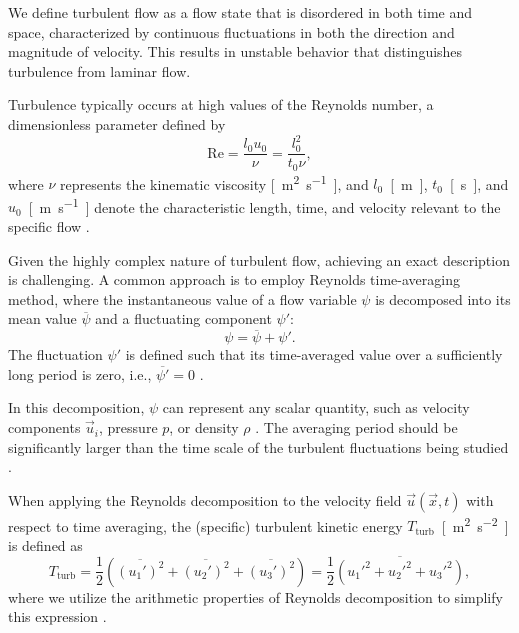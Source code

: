 We define turbulent flow as a flow state that is disordered in both time and space, characterized by continuous fluctuations in both the direction and magnitude of velocity. This results in unstable behavior that distinguishes turbulence from laminar flow.

Turbulence typically occurs at high values of the Reynolds number, a dimensionless parameter defined by
\begin{equation}\label{Re}
	\mathrm{Re} = \dfrac{l_{0} u_{0}}{\nu} = \dfrac{l^{2}_{0}}{t_{0} \nu},
\end{equation}
where $ \nu $ represents the kinematic viscosity \si{[m^2.s^{-1}]}, and $ l_{0} $~\si{[m]}, $ t_{0} $~\si{[s]}, and $ u_{0} $~\si{[m.s^{-1}]} denote the characteristic length, time, and velocity relevant to the specific flow \cite{Landau}.

Given the highly complex nature of turbulent flow, achieving an exact description is challenging. A common approach is to employ Reynolds time-averaging method, where the instantaneous value of a flow variable $ \psi $ is decomposed into its mean value $ \overline{\psi} $ and a fluctuating component $ \psi' $:
\begin{equation}
	\psi = \overline{\psi} + \psi'.
\end{equation}
The fluctuation $ \psi' $ is defined such that its time-averaged value over a sufficiently long period is zero, i.e., $ \overline{\psi'} = 0 $ \cite{Schlichting}.

In this decomposition, $ \psi $ can represent any scalar quantity, such as velocity components $ \vec{u}_i $, pressure $ p $, or density $ \rho $ \cite{Sodja2007}. The averaging period should be significantly larger than the time scale of the turbulent fluctuations being studied \cite{Sodja2007}.

When applying the Reynolds decomposition to the velocity field $ \vec{u} (\vec{x}, t) $ with respect to time averaging, the (specific) turbulent kinetic energy $ T_{\text{turb}} $~\si{[m^{2}.s^{-2}]} is defined as
\begin{equation}\label{eq:turb kin energy}
	T_{\text{turb}} = \dfrac{1}{2} \left( \overline{(u_1 ')^2} + \overline{(u_2 ')^2} + \overline{(u_3 ')^2} \right) = \dfrac{1}{2} \overline{ \left( u_1 '^2 + u_2 '^2 + u_3 '^2 \right) },
\end{equation}
where we utilize the arithmetic properties of Reynolds decomposition to simplify this expression \cite{Sodja2007}.
